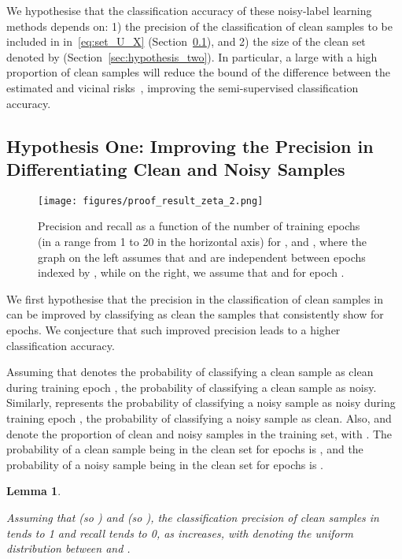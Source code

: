 \documentclass[review]{elsarticle}
\newtheorem{lemma}[theorem]{Lemma}
\begin{document}
We hypothesise that the classification accuracy of these noisy-label learning methods depends on: 1) the precision of the classification of clean samples to be included in  in~\eqref{eq:set_U_X} (Section~\ref{sec:hypothesis_one}), and 2) the size of the clean set denoted by  (Section~\ref{sec:hypothesis_two}). 
In particular, a large  with a high proportion of clean samples  will reduce the bound of the difference between the estimated and vicinal risks~\cite{zhang2018generalization}, improving the semi-supervised classification accuracy.  


\subsection{Hypothesis One: Improving the Precision in Differentiating Clean and Noisy Samples}
\label{sec:hypothesis_one}

\begin{figure}[h!]
\centering
\texttt{[image: figures/proof\_result\_zeta\_2.png]}
\caption{Precision and recall as a function of the number of training epochs  (in a range from 1 to 20 in the horizontal axis) for ,  and , where the graph on the left assumes that  and  are independent between epochs indexed by , while on the right, we assume that  and  for epoch .}
\label{fig:motivation_proof}
\end{figure}






We first hypothesise that the precision in the classification of clean samples in  can be improved by classifying as clean the samples that consistently show  for  epochs.  
We conjecture that such improved precision leads to a higher classification accuracy.

Assuming that  denotes the probability of classifying a clean sample as clean during training epoch ,  the probability of classifying a clean sample as noisy. Similarly,  represents the probability of classifying a noisy sample as noisy during training epoch ,  the probability of classifying a noisy sample as clean. Also,  and  denote the proportion of clean and noisy samples in the training set, with .  The probability of a clean sample being in the clean set  for  epochs is , and 
the probability of a noisy sample being in the clean set for  epochs is .


\begin{lemma}
\label{lemma:zeta}

Assuming that  (so ) and  (so ), the classification precision of clean samples in  tends to 1 and recall tends to 0, as  increases, with  denoting the uniform distribution between  and .

\end{lemma}
\end{document}
